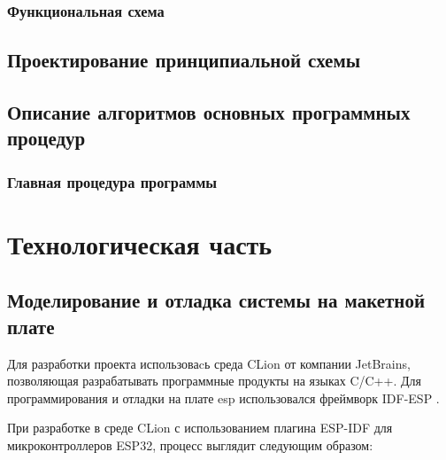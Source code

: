 \documentclass{bmstu}
\begin{document}
    \subsection{Функциональная схема}


    \section{Проектирование принципиальной схемы}


    \section{Описание алгоритмов основных программных процедур}

    \subsection{Главная процедура программы}
    




    \chapter{Технологическая часть}

    \section{Моделирование и отладка системы на макетной плате}

    Для разработки проекта использоваcь среда CLion \cite{ESPIDFCLion} от компании JetBrains, позволяющая разрабатывать программные продукты на языках C/C++.
    Для программирования и отладки на плате esp использовался фреймворк IDF-ESP \cite{GetStartedESP32}.

    При разработке в среде CLion с использованием плагина ESP-IDF для микроконтроллеров ESP32, процесс выглядит следующим образом:
\end{document}

